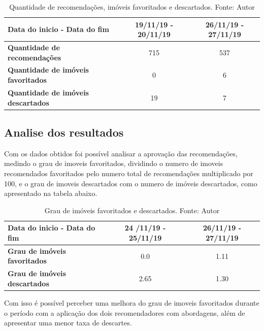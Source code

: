 \begin{table}[H]
\centering
\begin{tabular}{lcc}
\hline
\textbf{Data do inicio - Data do fim} & 19/11/19 - 20/11/19 & 26/11/19 - 27/11/19 \\ \hline
\textbf{Quantidade de recomendações} & 715 & 537 \\ \hline
\textbf{Quantidade de imóveis favoritados} & 0 & 6 \\ \hline
\textbf{Quantidade de imóveis descartados} & 19 & 7 \\ \hline
\end{tabular}
\caption[Quantidade de recomendações, imóveis favoritados e descartados]{Quantidade de recomendações, imóveis favoritados e descartados. Fonte: Autor}
\label{tab:my-table}
\end{table}



\subsection{Analise dos resultados}

Com os dados obtidos foi possível analisar a aprovação das recomendações, medindo o grau de imoveis favoritados, dividindo o numero de imoveis recomendados favoritados pelo numero total de recomendações multiplicado por 100, e o grau de imoveis descartados com o numero de imóveis descartados, como apresentado na tabela abaixo.

\begin{table}[H]
\centering
\begin{tabular}{lcc}
\hline
\textbf{Data do inicio - Data do fim} & 24 /11/19 - 25/11/19 & 26/11/19 - 27/11/19 \\ \hline
\textbf{Grau de imóveis favoritados} & 0.0 & 1.11 \\ \hline
\textbf{Grau de imóveis descartados} & 2.65 & 1.30 \\ \hline
\end{tabular}
\caption[Grau de imóveis favoritados e descartados]{Grau de imóveis favoritados e descartados. Fonte: Autor}
\label{tab:my-table2}
\end{table}

Com isso é possível perceber uma melhora do grau de imoveis favoritados durante o período com a aplicação dos dois recomendadores com abordagens, além de apresentar uma menor taxa de descartes.
